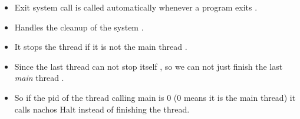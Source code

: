 \documentclass{article}
\begin{document}
\begin{itemize}
\begin{itemize}
\begin{itemize}
      \begin{itemize}
      \item
        Exit system call is called automatically whenever a program
        exits .
      \item
        Handles the cleanup of the system .
      \item
        It stops the thread if it is not the main thread .
      \item
        Since the last thread can not stop itself , so we can not just
        finish the last \emph{main} thread .
      \item
        So if the pid of the thread calling main is 0 (0 means it is the
        main thread) it calls nachos Halt instead of finishing the
        thread.
      \end{itemize}
    \end{itemize}
  \end{itemize}
\end{itemize}
\end{document}
